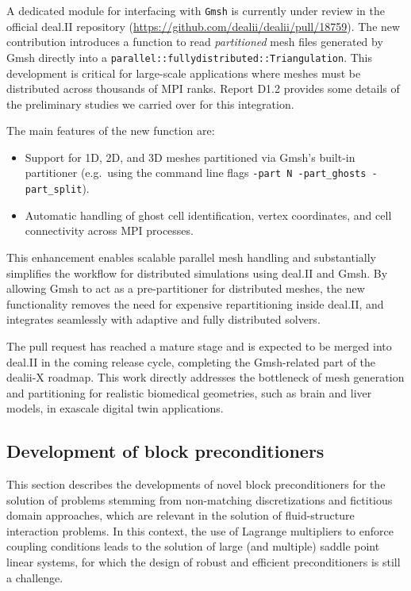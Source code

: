\documentclass[a4paper,12pt]{article}
\begin{document}
A dedicated module for interfacing with \texttt{Gmsh} is currently under
review in the official deal.II repository
(\url{https://github.com/dealii/dealii/pull/18759}).  
The new contribution introduces a function to read \emph{partitioned} mesh files
generated by Gmsh directly into a \texttt{parallel::fullydistributed::Triangulation}.
This development is critical for large-scale applications where meshes must be
distributed across thousands of MPI ranks. Report D1.2 provides some details of the preliminary studies we carried over for this integration.

The main features of the new function are:
\begin{itemize}
  \item Support for 1D, 2D, and 3D meshes partitioned via Gmsh's built-in
        partitioner (e.g.\ using the command line flags
        \verb|-part N -part_ghosts -part_split|).
  \item Automatic handling of ghost cell identification, vertex coordinates,
        and cell connectivity across MPI processes.
\end{itemize}

This enhancement enables scalable parallel mesh handling and substantially
simplifies the workflow for distributed simulations using deal.II and Gmsh.
By allowing Gmsh to act as a pre-partitioner for distributed meshes, the new
functionality removes the need for expensive repartitioning inside deal.II,
and integrates seamlessly with adaptive and fully distributed solvers.  

The pull request has reached a mature stage and is expected to be merged into
deal.II in the coming release cycle, completing the Gmsh-related part of the
dealii-X roadmap. This work directly addresses the bottleneck of mesh generation
and partitioning for realistic biomedical geometries, such as brain and liver
models, in exascale digital twin applications.


\subsection{Development of block preconditioners}
\label{sec:preconditioning}
This section describes the developments of novel block preconditioners for the solution of problems stemming from
non-matching discretizations and fictitious domain approaches, which are relevant in the solution
of fluid-structure interaction problems. In this context, the use of Lagrange multipliers to enforce coupling conditions
leads to the solution of large (and multiple) saddle point linear systems, for which the design of robust and
efficient preconditioners is still a challenge.
\end{document}
